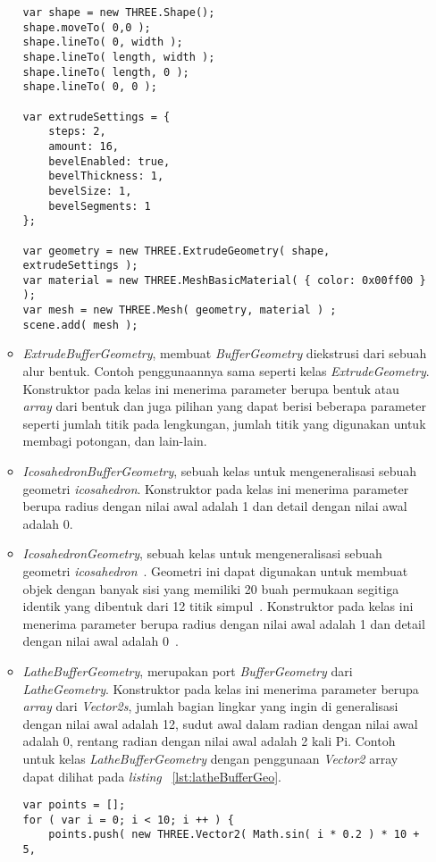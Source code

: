 \begin{itemize}
\begin{itemize}
\begin{lstlisting}[caption={Contoh penggunaan kelas {\it ExtrudeGeometry}.}, label={lst:extrudeGeo},captionpos=b]
var shape = new THREE.Shape();
shape.moveTo( 0,0 );
shape.lineTo( 0, width );
shape.lineTo( length, width );
shape.lineTo( length, 0 );
shape.lineTo( 0, 0 );

var extrudeSettings = {
	steps: 2,
	amount: 16,
	bevelEnabled: true,
	bevelThickness: 1,
	bevelSize: 1,
	bevelSegments: 1
};

var geometry = new THREE.ExtrudeGeometry( shape, extrudeSettings );
var material = new THREE.MeshBasicMaterial( { color: 0x00ff00 } );
var mesh = new THREE.Mesh( geometry, material ) ;
scene.add( mesh );
\end{lstlisting}
		\item {\it ExtrudeBufferGeometry}, membuat {\it BufferGeometry} diekstrusi dari sebuah alur bentuk. Contoh penggunaannya sama seperti kelas {\it ExtrudeGeometry}. Konstruktor pada kelas ini menerima parameter berupa bentuk atau {\it array} dari bentuk dan juga pilihan yang dapat berisi beberapa parameter seperti jumlah titik pada lengkungan, jumlah titik yang digunakan untuk membagi potongan, dan lain-lain.
		\item {\it IcosahedronBufferGeometry}, sebuah kelas untuk mengeneralisasi sebuah geometri {\it icosahedron}. Konstruktor pada kelas ini menerima parameter berupa radius dengan nilai awal adalah 1 dan detail dengan nilai awal adalah 0.
		\item {\it IcosahedronGeometry}, sebuah kelas untuk mengeneralisasi sebuah geometri {\it icosahedron}~\cite{threejs}. Geometri ini dapat digunakan untuk membuat objek dengan banyak sisi yang memiliki 20 buah permukaan segitiga identik yang dibentuk dari 12 titik simpul~\cite{learningThreejs}. Konstruktor pada kelas ini menerima parameter berupa radius dengan nilai awal adalah 1 dan detail dengan nilai awal adalah 0~\cite{threejs}.
		\item {\it LatheBufferGeometry}, merupakan port {\it BufferGeometry} dari {\it LatheGeometry}. Konstruktor pada kelas ini menerima parameter berupa {\it array} dari {\it Vector2s}, jumlah bagian lingkar yang ingin di generalisasi dengan nilai awal adalah 12, sudut awal dalam radian dengan nilai awal adalah 0, rentang radian dengan nilai awal adalah 2 kali Pi. Contoh untuk kelas {\it LatheBufferGeometry} dengan penggunaan {\it Vector2} array dapat dilihat pada {\it listing} ~\ref{lst:latheBufferGeo}.
\begin{lstlisting}[caption={Contoh penggunaan kelas {\it LatheBufferGeometry}.}, label={lst:latheBufferGeo},captionpos=b]
var points = [];
for ( var i = 0; i < 10; i ++ ) {
	points.push( new THREE.Vector2( Math.sin( i * 0.2 ) * 10 + 5,

\end{lstlisting}
\end{itemize}
\end{itemize}
